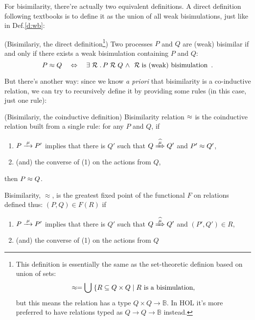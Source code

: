 For bisimilarity, there're actually two equivalent definitions. A direct definition following textbooks
is to define it as the union of all weak bisimulations, just like in Def.\;\ref{d:wb}:
\begin{definition}{(Bisimilariy, the direct definition\footnote{This definition is essentially the same as the set-theoretic definion based on union of sets:
\begin{equation*}
\approx = \bigcup\; \{ R \subseteq Q \times Q \;|\; R \mbox{ is a bisimulation},
\end{equation*}
but this means the relation has a type $Q\times Q\rightarrow\mathbb{B}$. In HOL it's more preferred to have relations typed as $Q\rightarrow Q\rightarrow\mathbb{B}$ instead.})}
\label{d:wb1}
Two processes $P$ and $Q$ are (weak) bisimilar if and only if there exists
a weak bisimulation containing $P$ and $Q$:
\begin{equation}
P \approx Q \quad\Leftrightarrow\quad\exists \mathrel{\cal R}.\, P \mathrel{\cal R} Q \ \wedge\ \mathrel{\cal R} \mbox{is (weak) bisimulation}
\enspace.
\end{equation}
\end{definition}

But there's another way: since we know \emph{a priori} that bisimilarity is a co-inductive relation, we can try to recursively define it by providing some rules (in this case, just one rule):
\begin{definition}{(Bisimilariy, the coinductive definition)}
\label{d:wb2}
Bisimilarity relation $\approx$ is the coinductive relation built from a single rule: for any $P$ and $Q$, if
\begin{enumerate}
\item $P \arr\mu P'$ implies that there is $Q'$ such that $Q \Arcap \mu Q'$ and $P' \approx Q'$,
\item (and) the converse of (1) on the actions from $Q$,
\end{enumerate}
then $P \approx Q$.
\end{definition}

\begin{definition}
Bisimilarity, $\approx$, is the greatest fixed point of the functional
$F$ on relations defined thus: $(P,Q) \in F(R)$ if 
\begin{enumerate}
\item $P \arr\mu P'$ implies that there is $Q'$ such that $Q \Arcap
  \mu Q'$ and $(P',Q')\in R$,
\item (and) the converse of (1) on the actions from $Q$
\end{enumerate}
\end{definition} 

